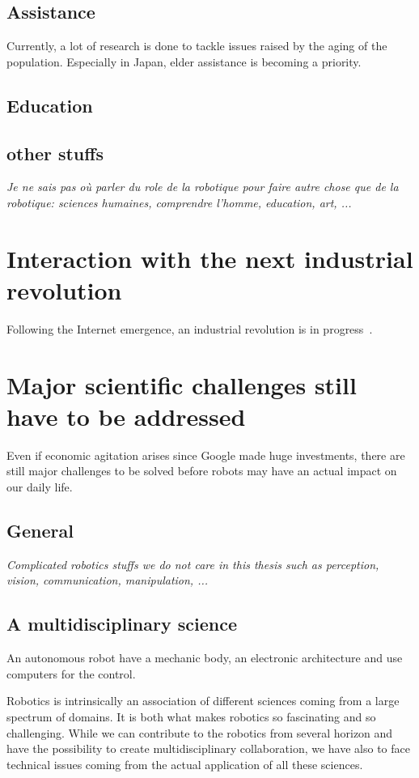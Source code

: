 \subsection{Assistance} %
Currently, a lot of research is done to tackle issues raised by the aging of the population.
Especially in Japan, elder assistance is becoming a priority.


\subsection{Education} %


\subsection{other stuffs} %
\emph{Je ne sais pas où parler du role de la robotique pour faire autre chose que de la robotique: sciences humaines, comprendre l'homme, education, art, ...}

\section{Interaction with the next industrial revolution} %
Following the Internet emergence, an industrial revolution is in progress~\cite{anderson2012makers}.


\section{Major scientific challenges still have to be addressed} %

Even if economic agitation arises since Google made huge investments, there are still major challenges to be solved before robots may have an actual impact on our daily life.


\subsection{General} %
\emph{Complicated robotics stuffs we do not care in this thesis such as perception, vision, communication, manipulation, ...}

\subsection{A multidisciplinary science} %
An autonomous robot have a mechanic body, an electronic architecture and use computers for the control.

Robotics is intrinsically an association of different sciences coming from a large spectrum of domains.
It is both what makes robotics so fascinating and so challenging.
While we can contribute to the robotics from several horizon and have the possibility to create multidisciplinary collaboration, we have also to face technical issues coming from the actual application of all these sciences.

